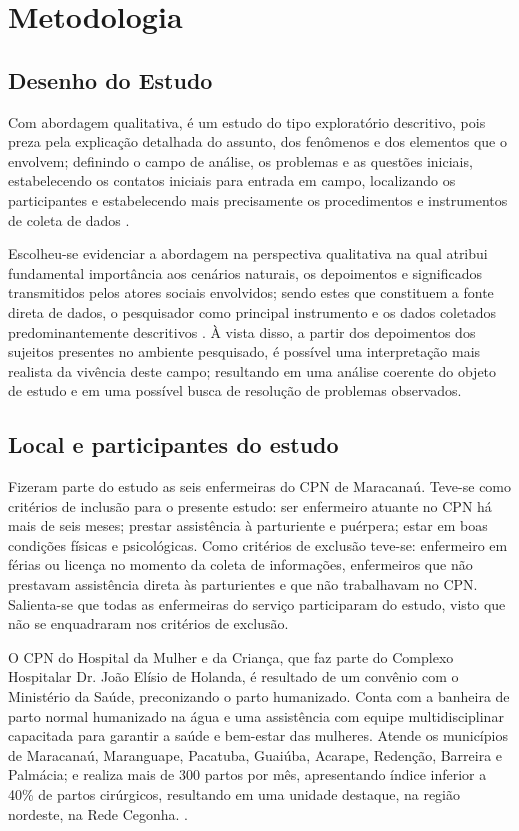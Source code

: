 \chapter{Metodologia}
\label{chap:metodologia}

\section{Desenho do Estudo}

Com abordagem qualitativa, é um estudo do tipo exploratório descritivo, pois preza pela explicação detalhada do assunto, dos fenômenos e dos elementos que o envolvem; definindo o campo de análise, os problemas e as questões iniciais, estabelecendo os contatos iniciais para entrada em campo, localizando os participantes e estabelecendo mais precisamente os procedimentos e instrumentos de coleta de dados \cite{andre2013estudo,augusto2013pesquisa}.

Escolheu-se evidenciar a abordagem na perspectiva qualitativa na qual atribui fundamental importância aos cenários naturais, os depoimentos e significados transmitidos pelos atores sociais envolvidos; sendo estes que constituem a fonte direta de dados, o pesquisador como principal instrumento e os dados coletados predominantemente descritivos \cite{augusto2013pesquisa,creswell2010projeto,vieira2005pesquisa}. À vista disso, a partir dos depoimentos dos sujeitos presentes no ambiente pesquisado, é possível uma interpretação mais realista da vivência deste campo; resultando em uma análise coerente do objeto de estudo e em uma possível busca de resolução de problemas observados. 

\section{Local e participantes do estudo}

Fizeram parte do estudo as seis enfermeiras do CPN de Maracanaú. Teve-se como critérios de inclusão para o presente estudo: ser enfermeiro atuante no CPN há mais de seis meses; prestar assistência à parturiente e puérpera; estar em boas condições físicas e psicológicas. Como critérios de exclusão teve-se: enfermeiro em férias ou licença no momento da coleta de informações, enfermeiros que não prestavam assistência direta às parturientes e que não trabalhavam no CPN. Salienta-se que todas as enfermeiras do serviço participaram do estudo, visto que não se enquadraram nos critérios de exclusão.

O CPN do Hospital da Mulher e da Criança, que faz parte do Complexo Hospitalar Dr. João Elísio de Holanda, é resultado de um convênio com o Ministério da Saúde, preconizando o parto humanizado. Conta com a banheira de parto normal humanizado na água e uma assistência com equipe multidisciplinar capacitada para garantir a saúde e bem-estar das mulheres.  Atende os municípios de Maracanaú, Maranguape, Pacatuba, Guaiúba, Acarape, Redenção, Barreira e Palmácia; e realiza mais de 300 partos por mês, apresentando índice inferior a 40\% de partos cirúrgicos, resultando em uma unidade destaque, na região nordeste, na Rede Cegonha. \cite{maracanau2019}.

